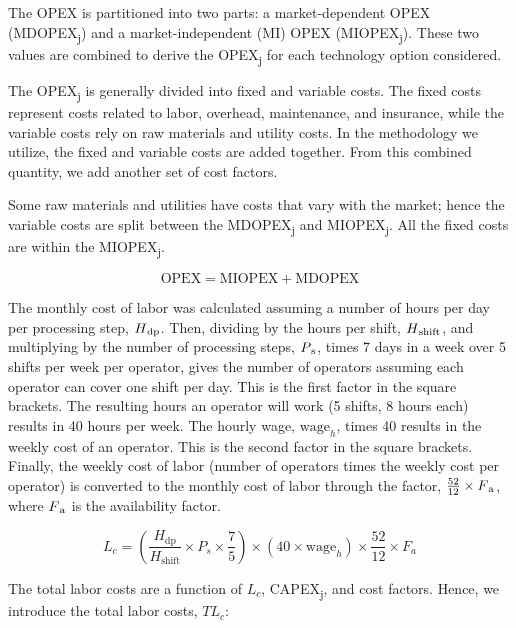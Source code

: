 \documentclass{article}
\begin{document}
The OPEX is partitioned into two parts: a market-dependent OPEX (MDOPEX\textsubscript{j}) and a market-independent (MI) OPEX (MIOPEX\textsubscript{j}). These two values are combined to derive the OPEX\textsubscript{j} for each technology option considered.

The OPEX\textsubscript{j} is generally divided into fixed and variable costs. The fixed costs represent costs related to labor, overhead, maintenance, and insurance, while the variable costs rely on raw materials and utility costs. In the methodology we utilize, the fixed and variable costs are added together. From this combined quantity, we add another set of cost factors.

Some raw materials and utilities have costs that vary with the market; hence the variable costs are split between the MDOPEX\textsubscript{j} and MIOPEX\textsubscript{j}. All the fixed costs are within the MIOPEX\textsubscript{j}.

\begin{equation}
\text{OPEX} = \text{MIOPEX} + \text{MDOPEX}
\label{eq:S13}
\end{equation}

The monthly cost of labor was calculated assuming a number of hours per day per processing step, \( H\textsubscript{dp} \). Then, dividing by the hours per shift, \( H\textsubscript{shift} \), and multiplying by the number of processing steps, \( P\textsubscript{s} \), times 7 days in a week over 5 shifts per week per operator, gives the number of operators assuming each operator can cover one shift per day. This is the first factor in the square brackets. The resulting hours an operator will work (5 shifts, 8 hours each) results in 40 hours per week. The hourly wage, \( \text{wage}_h \), times 40 results in the weekly cost of an operator. This is the second factor in the square brackets. Finally, the weekly cost of labor (number of operators times the weekly cost per operator) is converted to the monthly cost of labor through the factor, \( \frac{52}{12} \times F\textsubscript{a} \), where \( F\textsubscript{a} \) is the availability factor.

\begin{equation}
L_c = \left(\frac{H_{\text{dp}}}{H_{\text{shift}}} \times P_s \times \frac{7}{5}\right) \times \left(40 \times \text{wage}_h\right) \times \frac{52}{12} \times F_a
\label{eq:S14}
\end{equation}

The total labor costs are a function of \( L_c \), CAPEX\textsubscript{j}, and cost factors. Hence, we introduce the total labor costs, \( TL_c \):
\end{document}
